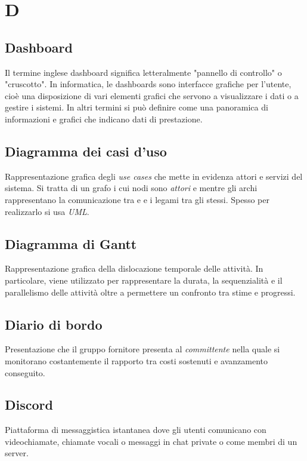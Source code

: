 \chapter{D}


\section{Dashboard}
Il termine inglese dashboard significa letteralmente "pannello di controllo" o "cruscotto". In informatica, le dashboards sono interfacce grafiche per l'utente, cioè una disposizione di vari elementi grafici che servono a visualizzare i dati o a gestire i sistemi. In altri termini si può definire come una panoramica di informazioni e grafici che indicano dati di prestazione.

\section{Diagramma dei casi d'uso}\label{sec:Diagrammi dei casi d'uso}
Rappresentazione grafica degli \emph{use cases} che mette in evidenza attori e servizi del sistema. Si tratta di un grafo i cui nodi sono \emph{attori} e  mentre gli archi rappresentano la comunicazione tra  e  e i legami tra gli  stessi. Spesso per realizzarlo si usa \emph{UML}.

\section{Diagramma di Gantt}\label{sec:Diagrammi di Gantt}
Rappresentazione grafica della dislocazione temporale delle attività. In particolare, viene utilizzato per rappresentare la durata, la sequenzialità e il parallelismo delle attività oltre a permettere un confronto tra stime e progressi.

\section{Diario di bordo}\label{sec:Diari di bordo}
Presentazione che il gruppo fornitore presenta al \emph{committente} nella quale si monitorano costantemente il rapporto tra costi sostenuti e avanzamento conseguito.

\section{Discord}
Piattaforma di messaggistica istantanea dove gli utenti comunicano con videochiamate, chiamate vocali o messaggi in chat private o come membri di un server.
